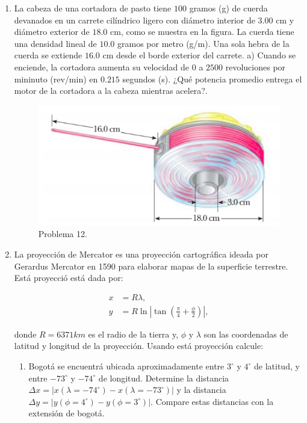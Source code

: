 \documentclass{article}
\begin{document}
\begin{enumerate}
\item La cabeza de una cortadora de pasto tiene $100$ gramos (g) de cuerda devanados en un carrete cilíndrico ligero con diámetro interior de $3$.$00$ cm y diámetro exterior de $18$.$0$ cm, como se muestra en la figura. La cuerda tiene una densidad lineal de $10$.$0$ gramos por metro (g/m). Una sola hebra de la cuerda se extiende $16$.$0$ cm desde el borde exterior del carrete. a) Cuando se enciende, la cortadora aumenta su velocidad de $0$ a $2500$ revoluciones por mininuto (rev/min) en $0$.$215$ segundos (s). ¿Qué potencia promedio entrega el motor de la cortadora a la cabeza mientras acelera?.


\begin{figure}[H]
\centering
\includegraphics[scale=0.4]{problema_12.png}
\caption{Problema 12.}
\end{figure}

\item La proyección de Mercator es una proyección cartográfica ideada por Gerardus Mercator en 1590 para elaborar mapas de la superficie terrestre. Está proyecció está dada por:

\begin{align*}
x&=R\lambda, \\
y&=R\ln\left|\tan\left(\frac{\pi}{4}+\frac{\phi}{2}\right)\right|,
\end{align*}

donde $R=6371km$ es el radio de la tierra y, $\phi$ y  $\lambda$ son las coordenadas de latitud y longitud de la proyección. Usando está proyección calcule:

\begin{enumerate}
\item Bogotá se encuentrá ubicada aproximadamente entre $3^{\circ}$ y $4^{\circ}$ de latitud, y entre $-73^{\circ}$ y $-74^{\circ}$ de longitud. Determine la distancia $\Delta x=|x(\lambda=-74^{\circ})-x(\lambda=-73^{\circ})|$ y la distancia\\
\noindent $\Delta y=|y(\phi=4^{\circ})-y(\phi=3^{\circ})|$. Compare estas distancias con la extensión de bogotá.
\end{enumerate}


\end{enumerate}
\end{document}
